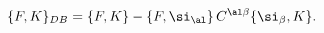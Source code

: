 \begin{equation}
\{ F,K\}_{DB} =\{ F,K\}-
\{ F,\si_{\al}\}\, C^{\al\beta}\{ \si_{\beta},K\}.
\label{ona}
\end{equation}

